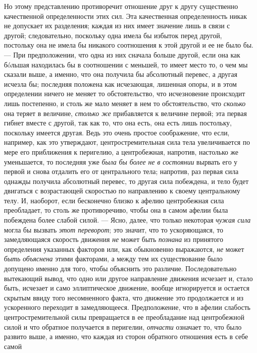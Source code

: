 Но этому представлению противоречит отношение друг к другу существенно
качественной определенности этих сил. Эта качественная определенность никак
не допускает их разделения; каждая из них имеет значение лишь в связи с
другой; следовательно, поскольку одна имела бы избыток перед другой,
постольку она не имела бы никакого соотношения к этой другой и ее не было
бы. — При предположении, что одна из них сначала больше другой, если она
как бóльшая находилась бы в соотношении с меньшей, то имеет место то, о чем
мы сказали выше, а именно, что она получила бы абсолютный перевес, а другая
исчезла бы; последняя положена как исчезающая, лишенная опоры, и в этом
определении ничего не меняет то обстоятельство, что исчезновение происходит
лишь постепенно, и столь же мало меняет в нем то обстоятельство, что
{\em сколько} она теряет в величине,
{\em столько же} прибавляется к величине первой; эта
первая гибнет вместе с другой, так как то, что она есть, она есть лишь
постольку, поскольку имеется другая. Ведь это очень простое соображение,
что если, например, как это утверждают, центростремительная сила тела
увеличивается по мере его приближения к перигелию, а центробежная,
напротив, настолько же уменьшается, то последняя уже
{\em была бы более не в состоянии} вырвать его у первой
и снова отдалить его от центрального тела; напротив, раз первая сила
однажды получила абсолютный перевес, то другая сила побеждена, и тело будет
двигаться с возрастающей скоростью по направлению к своему центральному
телу. И, наоборот, если бесконечно близко к афелию центробежная сила
преобладает, то столь же противоречиво, чтобы она в самом афелии была
побеждена более слабой силой. — Ясно, далее, что только некоторая
{\em чужая сила} могла бы вызвать
{\em этот переворот}; это значит, что то ускоряющаяся,
то замедляющаяся скорость движения {\em не} может быть
{\em познана} из принятого определения указанных
факторов или, как обыкновенно выражаются, {\em не}
может {\em быть объяснена} этими факторами, а между тем
их существование было допущено именно для того, чтобы объяснить это
различие. Последовательно вытекающий вывод, что одно или другое направление
движения исчезает и, стало быть, исчезает и само эллиптическое движение,
вообще игнорируется и остается скрытым ввиду того несомненного факта, что
движение это продолжается и из ускоренного переходит в замедляющееся.
Предположение, что в афелии слабость центростремительной силы превращается
в ее преобладание над центробежной силой и что обратное получается в
перигелии, {\em отчасти} означает то, что было развито
выше, а именно, что каждая из сторон обратного отношения есть в себе самой
